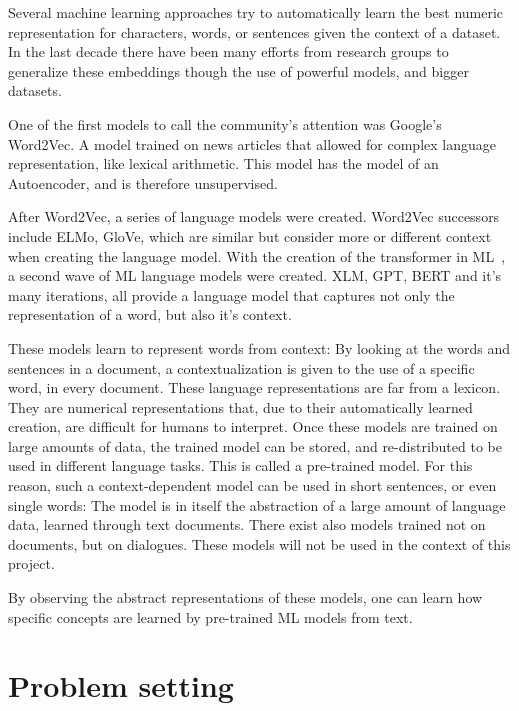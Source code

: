 Several machine learning approaches try to automatically learn the best numeric representation for characters, words, or sentences given the context of a dataset. In the last decade there have been many efforts from research groups to generalize these embeddings though the use of powerful models, and bigger datasets.

One of the first models to call the community's attention was Google's Word2Vec\cite{mikolov2013word2vec}. A model trained on news articles that allowed for complex language representation, like lexical arithmetic. This model has the model of an Autoencoder, and is therefore unsupervised.

After Word2Vec, a series of language models were created. Word2Vec successors include ELMo, GloVe, which are similar but consider more or different context when creating the language model. With the creation of the transformer in ML~\cite{vaswani2017transformer}, a second wave of ML language models were created. XLM, GPT, BERT and it's many iterations, all provide a language model that captures not only the representation of a word, but also it's context.

These models learn to represent words from context: By looking at the words and sentences in a document, a contextualization is given to the use of a specific word, in every document. These language representations are far from a lexicon. They are numerical representations that, due to their automatically learned creation, are difficult for humans to interpret. Once these models are trained on large amounts of data, the trained model can be stored, and re-distributed to be used in different language tasks. This is called a pre-trained model. For this reason, such a context-dependent model can be used in short sentences, or even single words: The model is in itself the abstraction of a large amount of language data, learned through text documents.
There exist also models trained not on documents, but on dialogues. These models will not be used in the context of this project.

By observing the abstract representations of these models, one can learn how specific concepts are learned by pre-trained ML models from text.

\section{Problem setting}\label{sec:Problem setting}

